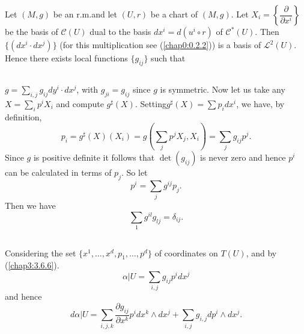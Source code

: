 Let $(M,g)$ be an r.m.\@ and let $(U,r)$ be a chart of $(M,g)$. Let
$X_{i}=\left\{\dfrac{\partial}{\partial x^{i}}\right\}$ be the basis
of $\mathscr{C}(U)$ dual to the basis $dx^{i}=d(u^{i}\circ r)$ of
$\mathscr{C}^{\ast}(U)$. Then $\{(dx^{i}\cdot dx^{j})\}$ (for this
multiplication see (\ref{chap0:0.2.2})) is a basis of
$\mathscr{L}^{2}(U)$. Hence there exists local functions $\{g_{ij}\}$
such that

\subsection{}\label{chap3:3.8.1}
$g=\sum\limits_{i,j}g_{ij}dy^{i}\cdot dx^{j}$, with $g_{ji}=g_{ij}$
since $g$ is symmetric. Now let us take any
$X=\sum\limits_{i}p^{i}X_{i}$ and compute
$g^{\sharp}(X)$. Setting\pageoriginale $g^{\sharp}(X)=\sum
p_{i}dx^{i}$, we have, by definition,
\begin{equation*}
p_{i}=g^{\sharp}(X)(X_{i})=g(\sum_{j}p^{j}X_{j},X_{i})=\sum_{j}g_{ij}p^{j}.\tag{3.8.2}\label{chap3:3.8.2} 
\end{equation*}
Since $g$ is positive definite it follows that $\det(g_{ij})$ is never
zero and hence $p^{i}$ can be calculated in terms of $p_{j}$. So let
\begin{equation*}
p^{i}=\sum_{j}g^{ij}p_{j}.\tag{3.8.3}\label{chap3:3.8.3}
\end{equation*}
Then we have
$$
\sum_{1}g^{il}g_{lj}=\delta_{ij}.
$$

\setcounter{subsection}{3}
\subsection{}\label{chap3:3.8.4}
Considering the set $\{x^{1},\ldots,x^{d},p_{1},\ldots,p^{d}\}$ of
coordinates on $T(U)$, and by (\ref{chap3:3.6.6}).
\begin{equation*}
\alpha|U =\sum_{i,j}g_{ij}p^{i}dx^{j}\tag{3.8.5}\label{chap3:3.8.5}
\end{equation*}
and hence
\begin{equation*}
d\alpha | U=\sum_{i,j,k}\frac{\partial g_{ij}}{\partial
  x^{k}}p^{i}dx^{k}\wedge dx^{j}+\sum_{i,j}g_{i,j}dp^{i}\wedge
dx^{j}.\tag{3.8.6}\label{chap3:3.8.6} 
\end{equation*}
